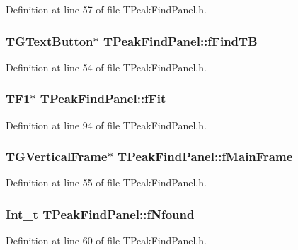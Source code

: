 Definition at line 57 of file TPeakFindPanel.h.
\subsubsection[{fFindTB}]{\setlength{\rightskip}{0pt plus 5cm}TGTextButton$\ast$ {\bf TPeakFindPanel::fFindTB}\hspace{0.3cm}{\ttfamily  [private]}}\label{classTPeakFindPanel_ac803c9c73a8f00c37b14db60570344e5}


Definition at line 54 of file TPeakFindPanel.h.
\subsubsection[{fFit}]{\setlength{\rightskip}{0pt plus 5cm}TF1$\ast$ {\bf TPeakFindPanel::fFit}\hspace{0.3cm}{\ttfamily  [protected]}}\label{classTPeakFindPanel_ab3da441de579dbe67bf5195eaf862c55}


Definition at line 94 of file TPeakFindPanel.h.
\subsubsection[{fMainFrame}]{\setlength{\rightskip}{0pt plus 5cm}TGVerticalFrame$\ast$ {\bf TPeakFindPanel::fMainFrame}\hspace{0.3cm}{\ttfamily  [private]}}\label{classTPeakFindPanel_af76ba4a366293e953618a4dc3590fa5c}


Definition at line 55 of file TPeakFindPanel.h.
\subsubsection[{fNfound}]{\setlength{\rightskip}{0pt plus 5cm}Int\_\-t {\bf TPeakFindPanel::fNfound}\hspace{0.3cm}{\ttfamily  [private]}}\label{classTPeakFindPanel_accf2fd543ef0eada73fb8bb84eec599a}


Definition at line 60 of file TPeakFindPanel.h.
